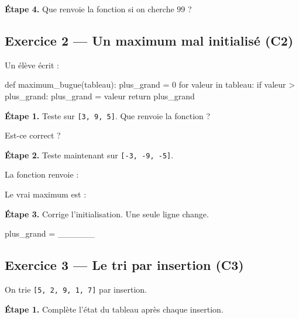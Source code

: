 \bigskip

\textbf{Étape 4.} Que renvoie la fonction si on cherche $99$ ?

\medskip
\dotfill

\bigskip
\bigskip

\subsection*{Exercice 2 --- Un maximum mal initialisé (C2)}

Un élève écrit :

\begin{python}
def maximum_bugue(tableau):
    plus_grand = 0
    for valeur in tableau:
        if valeur > plus_grand:
            plus_grand = valeur
    return plus_grand
\end{python}

\bigskip

\textbf{Étape 1.} Teste sur \texttt{[3, 9, 5]}. Que renvoie la fonction ?

\medskip
\dotfill \qquad Est-ce correct ?  \qquad {}

\bigskip

\textbf{Étape 2.} Teste maintenant sur \texttt{[-3, -9, -5]}.

\medskip
La fonction renvoie : \dotfill

\medskip
Le vrai maximum est : \dotfill

\bigskip

\textbf{Étape 3.} Corrige l'initialisation. Une seule ligne change.

\begin{python}
    plus_grand = ______
\end{python}

\medskip
\begin{center}
 \qquad {} \qquad {}
\end{center}

\bigskip
\bigskip

\subsection*{Exercice 3 --- Le tri par insertion (C3)}

On trie \texttt{[5, 2, 9, 1, 7]} par insertion.

\bigskip

\textbf{Étape 1.} Complète l'état du tableau après chaque insertion.

